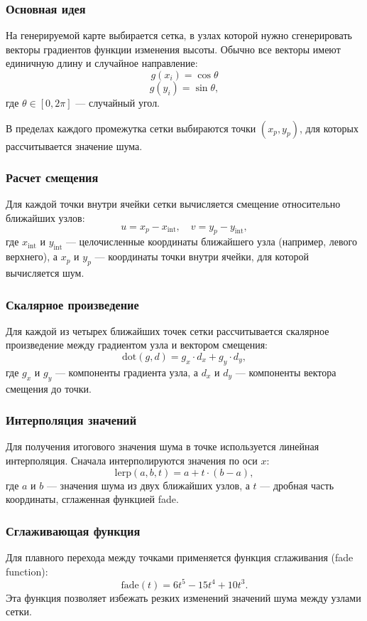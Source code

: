 \subsubsection{Основная идея}
На генерируемой карте выбирается сетка, в узлах которой нужно сгенерировать векторы градиентов функции изменения высоты. Обычно все векторы имеют единичную длину и случайное направление:
\[
g(x_i) = \cos{\theta}
\]
\[
g(y_i) = \sin{\theta},
\]
где $\theta \in [0, 2\pi]$ — случайный угол.

В пределах каждого промежутка сетки выбираются точки $(x_p, y_p)$, для которых рассчитывается значение шума.

\subsubsection{Расчет смещения}
Для каждой точки внутри ячейки сетки вычисляется смещение относительно ближайших узлов:
\[
u = x_p - x_{\text{int}}, \quad v = y_p - y_{\text{int}},
\]
где $x_{\text{int}}$ и $y_{\text{int}}$ — целочисленные координаты ближайшего узла (например, левого верхнего), а $x_p$ и $y_p$ — координаты точки внутри ячейки, для которой вычисляется шум.

\subsubsection{Скалярное произведение}
Для каждой из четырех ближайших точек сетки рассчитывается скалярное произведение между градиентом узла и вектором смещения:
\[
\text{dot}(g, d) = g_x \cdot d_x + g_y \cdot d_y,
\]
где $g_x$ и $g_y$ — компоненты градиента узла, а $d_x$ и $d_y$ — компоненты вектора смещения до точки.

\subsubsection{Интерполяция значений}
Для получения итогового значения шума в точке используется линейная интерполяция. Сначала интерполируются значения по оси $x$:
\[
\text{lerp}(a, b, t) = a + t \cdot (b - a),
\]
где $a$ и $b$ — значения шума из двух ближайших узлов, а $t$ — дробная часть координаты, сглаженная функцией fade.

\subsubsection{Сглаживающая функция}
Для плавного перехода между точками применяется функция сглаживания (fade function):
\[
\text{fade}(t) = 6t^5 - 15t^4 + 10t^3.
\]
Эта функция позволяет избежать резких изменений значений шума между узлами сетки.

